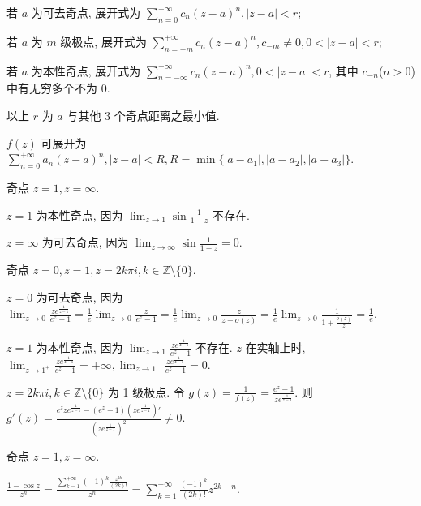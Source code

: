 \documentclass{homework}
\begin{document}
\maketitle

\begin{center}
\end{center}

若 \(a\) 为可去奇点, 展开式为 \(\sum_{n=0}^{+\infty}c_n(z-a)^n, |z-a|<r\);

若 \(a\) 为 \(m\) 级极点, 展开式为 \(\sum_{n=-m}^{+\infty}c_n(z-a)^n, c_{-m}\neq0, 0<|z-a|<r\);

若 \(a\) 为本性奇点, 展开式为 \(\sum_{n=-\infty}^{+\infty}c_n(z-a)^n, 0<|z-a|<r\), 其中 \(c_{-n}\)(\(n>0\)) 中有无穷多个不为 0.

以上 \(r\) 为 \(a\) 与其他 3 个奇点距离之最小值.

\(f(z)\) 可展开为 \(\sum_{n=0}^{+\infty}a_n(z-a)^n, |z-a|<R, R=\min\{|a-a_1|, |a-a_2|, |a-a_3|\}\).

奇点 \(z=1, z=\infty\).

\(z=1\) 为本性奇点, 因为 \(\lim_{z\to1}\sin\frac{1}{1-z}\) 不存在.

\(z=\infty\) 为可去奇点, 因为 \(\lim_{z\to\infty}\sin\frac{1}{1-z}=0\).

奇点 \(z=0, z=1, z=2k\pi i, k\in\mathbb{Z}\setminus\{0\}\).

\(z=0\) 为可去奇点, 因为 \(\lim_{z\to0}\frac{ze^{\frac{1}{z-1}}}{e^z-1}=\frac{1}{e}\lim_{z\to0}\frac{z}{e^z-1}=\frac{1}{e}\lim_{z\to0}\frac{z}{z+o(z)}=\frac{1}{e}\lim_{z\to0}\frac{1}{1+\frac{o(z)}{z}}=\frac{1}{e}\).

\(z=1\) 为本性奇点, 因为 \(\lim_{z\to1}\frac{ze^{\frac{1}{z-1}}}{e^z-1}\) 不存在. \(z\) 在实轴上时, \(\lim_{z\to1^+}\frac{ze^{\frac{1}{z-1}}}{e^z-1}=+\infty, \lim_{z\to1^-}\frac{ze^{\frac{1}{z-1}}}{e^z-1}=0.\)

\(z=2k\pi i, k\in\mathbb{Z}\setminus\{0\}\) 为 1 级极点. 令 \(g(z)=\frac{1}{f(z)}=\frac{e^z-1}{ze^{\frac{1}{z-1}}}\). 则 \(g'(z)=\frac{e^zze^{\frac{1}{z-1}}-(e^z-1)(ze^{\frac{1}{z-1}})'}{(ze^{\frac{1}{z-1}})^2}\neq0\).


奇点 \(z=1, z=\infty\).

\(\frac{1-\cos z}{z^n}=\frac{\sum_{k=1}^{+\infty}(-1)^k\frac{z^{2k}}{(2k)!}}{z^n}=\sum_{k=1}^{+\infty}\frac{(-1)^k}{(2k)!}z^{2k-n}\).
\end{document}
